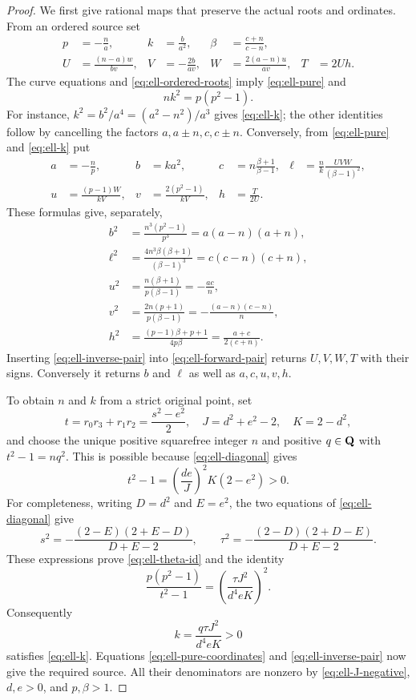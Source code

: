 \begin{proof}
We first give rational maps that preserve the actual roots and ordinates.
From an ordered source set
\begin{equation}\label{eq:ell-forward-pair}
 \begin{aligned}
 p&=-\frac na,& k&=\frac b{a^2},&
 \beta&=\frac{c+n}{c-n},\\
 U&=\frac{(n-a)w}{bv},&
 V&=-\frac{2b}{av},&
 W&=\frac{2(a-n)u}{av},& T&=2Uh.
 \end{aligned}
\end{equation}
The curve equations and \eqref{eq:ell-ordered-roots} imply
\eqref{eq:ell-pure} and
\begin{equation}\label{eq:ell-k}
 nk^2=p(p^2-1).
\end{equation}
For instance, $k^2=b^2/a^4=(a^2-n^2)/a^3$ gives
\eqref{eq:ell-k}; the other identities follow by cancelling the factors
$a,a\pm n,c,c\pm n$.
Conversely, from \eqref{eq:ell-pure} and \eqref{eq:ell-k} put
\begin{equation}\label{eq:ell-inverse-pair}
 \begin{aligned}
 a&=-\frac np,& b&=ka^2,&
 c&=n\frac{\beta+1}{\beta-1},&
 \ell&=\frac nk\frac{UVW}{(\beta-1)^2},\\
 u&=\frac{(p-1)W}{kV},&
 v&=\frac{2(p^2-1)}{kV},&
 h&=\frac T{2U}.&&
 \end{aligned}
\end{equation}
These formulas give, separately,
\[
 \begin{aligned}
 b^2&=\frac{n^3(p^2-1)}{p^3}=a(a-n)(a+n),\\
 \ell^2&=\frac{4n^3\beta(\beta+1)}{(\beta-1)^3}
          =c(c-n)(c+n),\\
 u^2&=\frac{n(\beta+1)}{p(\beta-1)}=-\frac{ac}{n},\\
 v^2&=\frac{2n(p+1)}{p(\beta-1)}=-\frac{(a-n)(c-n)}n,\\
 h^2&=\frac{(p-1)\beta+p+1}{4p\beta}
       =\frac{a+c}{2(c+n)}.
 \end{aligned}
\]
Inserting \eqref{eq:ell-inverse-pair} into
\eqref{eq:ell-forward-pair} returns $U,V,W,T$ with their signs.
Conversely it returns $b$ and $\ell$ as well as $a,c,u,v,h$.

To obtain $n$ and $k$ from a strict original point, set
\[
 t=r_0r_3+r_1r_2=\frac{s^2-e^2}{2},\quad
 J=d^2+e^2-2,\quad K=2-d^2,
\]
and choose the unique positive squarefree integer $n$ and positive
$q\in\mathbf Q$ with $t^2-1=nq^2$.  This is possible because
\eqref{eq:ell-diagonal} gives
\begin{equation}\label{eq:ell-theta-id}
 t^2-1=\left(\frac{de}{J}\right)^2K(2-e^2)>0.
\end{equation}
For completeness, writing $D=d^2$ and $E=e^2$, the two equations of
\eqref{eq:ell-diagonal} give
\[
 s^2=-\frac{(2-E)(2+E-D)}{D+E-2},\qquad
 \tau^2=-\frac{(2-D)(2+D-E)}{D+E-2}.
\]
These expressions prove \eqref{eq:ell-theta-id} and the identity
\[
 \frac{p(p^2-1)}{t^2-1}
   =\left(\frac{\tau J^2}{d^4eK}\right)^2.
\]
Consequently
\[
 k=\frac{q\tau J^2}{d^4eK}>0
\]
satisfies \eqref{eq:ell-k}.  Equations
\eqref{eq:ell-pure-coordinates} and \eqref{eq:ell-inverse-pair}
now give the required source.  All their denominators are nonzero
by \eqref{eq:ell-J-negative}, $d,e>0$, and $p,\beta>1$.


\end{proof}
